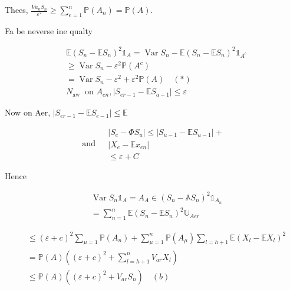 \documentclass{amsbook}
\theoremstyle{plain}%
\theoremstyle{definition}
\theoremstyle{remark}
\begin{document}
Thees, $\frac{V a_{n} S_{n}}{\varepsilon^{2}} \geqslant \sum_{e=1}^{n} \mathbb{P}\left(A_{n}\right)=\mathbb{P}(A)$.

Fa be neverse ine qualty

$$
\begin{aligned}
& \mathbb{E}\left(S_{n}-\mathbb{E} S_{n}\right)^{2} \mathbb{1}_{A}=\operatorname{Var} S_{n}-\mathbb{E}\left(S_{n}-\mathbb{E} S_{n}\right)^{2} \mathbb{1}_{A^{c}} \\
& \geqslant \operatorname{Var} S_{n}-\varepsilon^{2} \mathbb{P}\left(A^{c}\right)                                                                                \\
& =\operatorname{Var} S_{n}-\varepsilon^{2}+\varepsilon^{2} \mathbb{P}(A) \quad(*)                                                                               \\
& N_{\text {aw }} \text { on } A_{e n},\left|S_{e r-1}-\mathbb{E} S_{a-1}\right| \leq \varepsilon
\end{aligned}
$$

Now on Aer, $\left|S_{e r-1}-\mathbb{E} S_{e-1}\right| \leq \mathbb{E}$

$$
\text { and }
\begin{aligned}
& \left|S_{e}-\Phi S_{u}\right| \leq\left|S_{u-1}-\mathbb{E} S_{u-1}\right|+ \\
& \left|X_{e}-\mathbb{E} x_{e n}\right|                                      \\
& \leq \varepsilon+C
\end{aligned}
$$

Hence

$$
\begin{aligned}
& \operatorname{Var} S_{n} \mathbb{1}_{A}=A_{A} \in\left(S_{n}-\mathbb{A} S_{n}\right)^{2} \mathbb{1}_{A_{n}} \\
& =\sum_{n=1}^{n} \mathbb{E}\left(S_{n}-\mathbb{E} S_{n}\right)^{2} \mathbb{U}_{A e r}
\end{aligned}
$$

$$
\begin{aligned}
& \leq(\varepsilon+c)^{2} \sum_{\mu=1} \mathbb{P}\left(A_{n}\right)+\sum_{\mu=1}^{n} \mathbb{P}\left(A_{\mu}\right) \sum_{l=h+1} \mathbb{E}\left(X_{l}-\mathbb{E} X_{l}\right)^{2} \\
& =\mathbb{P}(A)\left((\varepsilon+c)^{2}+\sum_{l=h+1}^{n} V_{a r} X_{l}\right)                                                                                                    \\
& \leq \mathbb{P}(A)\left((\varepsilon+c)^{2}+V_{a r} S_{n}\right) \quad(b)
\end{aligned}
$$
\end{document}
